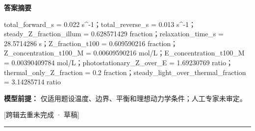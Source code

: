 \documentclass[UTF8,11pt,a4paper]{ctexart}
\begin{document}
\noindent\textbf{答案摘要}\par
total\_forward\_s = 0.022 s\textasciicircum{}-1；total\_reverse\_s = 0.013 s\textasciicircum{}-1；steady\_Z\_fraction\_illum = 0.628571429 fraction；relaxation\_time\_s = 28.5714286 s；Z\_fraction\_t100 = 0.609590216 fraction；Z\_concentration\_t100\_M = 0.00609590216 mol/L；E\_concentration\_t100\_M = 0.00390409784 mol/L；photostationary\_Z\_over\_E = 1.69230769 ratio；thermal\_only\_Z\_fraction = 0.2 fraction；steady\_light\_over\_thermal\_fraction = 3.14285714 ratio\par
\noindent\textbf{模型前提：}
仅适用题设温度、边界、平衡和理想动力学条件；人工专家未审定。\par
\noindent\textcolor{red!65!black}{[跨辑去重未完成 · 草稿]} \par
\medskip\hrule\medskip
{}
\end{document}
